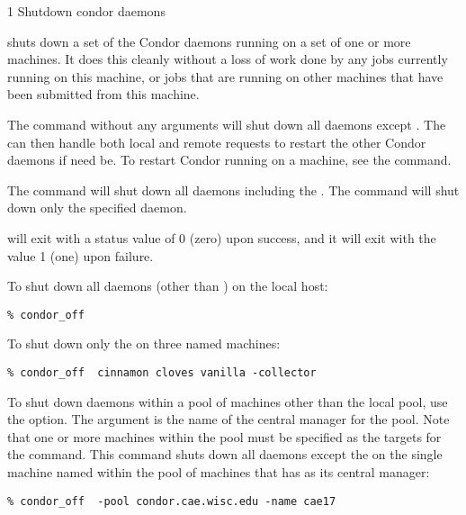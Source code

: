 \begin{ManPage}{\label{man-condor-off}}{1}
{Shutdown condor daemons}
\Synopsis {}
\ToolArgsBase

\ToolArgsLocate
\ToolArgsAffect

\ToolWhere
\ToolArgsAffect


\Description 

 shuts down a set of the Condor daemons running on a set of
one or more machines.
It does this cleanly without a loss of work done by any jobs
currently running on this machine, or jobs that are running on other machines
that have been submitted from this machine.

The command  without any arguments will shut down
all daemons except .
The  can then handle both local and remote
requests to restart the other Condor daemons if need be.  To restart
Condor running on a machine, see the  command.

The command  will shut down
all daemons including the .
The command  will shut down
only the specified daemon.

\begin{Options}
	\ToolArgsBaseDesc
	\ToolArgsLocateDesc
	\ToolArgsAffectDesc
\end{Options}

\ExitStatus
{} will exit with a status value of 0 (zero) upon success,
and it will exit with the value 1 (one) upon failure.


\Examples
To shut down all daemons (other than ) on the
local host:
\begin{verbatim}
% condor_off
\end{verbatim}

To shut down only the  on three named machines:
\begin{verbatim}
% condor_off  cinnamon cloves vanilla -collector
\end{verbatim}

To shut down daemons within a pool of machines other than the
local pool, use the  option.
The argument is the name of the central manager for the pool.
Note that one or more machines within the pool must be
specified as the targets for the command.
This command shuts down all daemons except the 
on the single machine named  within the
pool of machines that has  as
its central manager:
\begin{verbatim}
% condor_off  -pool condor.cae.wisc.edu -name cae17
\end{verbatim}

\end{ManPage}
